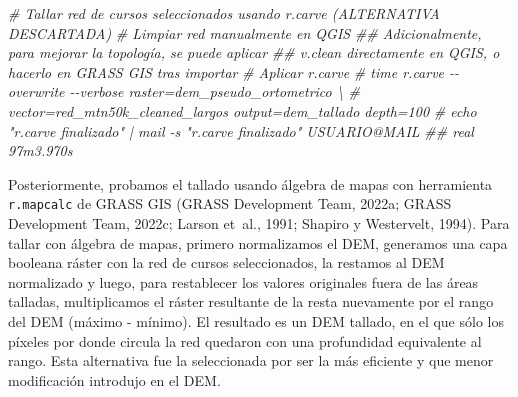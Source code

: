 \documentclass[spanish]{article}
\newenvironment{Shaded}{\begin{snugshade}}{\end{snugshade}}
\newcommand{\CommentTok}[1]{\textcolor[rgb]{0.56,0.35,0.01}{\textit{#1}}}
\begin{document}
\begin{Shaded}
\begin{Highlighting}[]
\CommentTok{\# Tallar red de cursos seleccionados usando r.carve (ALTERNATIVA DESCARTADA)}
\CommentTok{\# Limpiar red manualmente en QGIS}
\CommentTok{\#\# Adicionalmente, para mejorar la topología, se puede aplicar}
\CommentTok{\#\# v.clean directamente en QGIS, o hacerlo en GRASS GIS tras importar}
\CommentTok{\# Aplicar r.carve}
\CommentTok{\# time r.carve {-}{-}overwrite {-}{-}verbose raster=dem\_pseudo\_ortometrico \textbackslash{}}
\CommentTok{\#   vector=red\_mtn50k\_cleaned\_largos output=dem\_tallado depth=100}
\CommentTok{\# echo "r.carve finalizado" | mail {-}s "r.carve finalizado" USUARIO@MAIL}
\CommentTok{\#\# real 97m3.970s}
\end{Highlighting}
\end{Shaded}

Posteriormente, probamos el tallado usando álgebra de mapas con
herramienta \texttt{r.mapcalc} de GRASS GIS (GRASS Development Team,
2022a; GRASS Development Team, 2022c; Larson et~al., 1991; Shapiro y
Westervelt, 1994). Para tallar con álgebra de mapas, primero
normalizamos el DEM, generamos una capa booleana ráster con la red de
cursos seleccionados, la restamos al DEM normalizado y luego, para
restablecer los valores originales fuera de las áreas talladas,
multiplicamos el ráster resultante de la resta nuevamente por el rango
del DEM (máximo - mínimo). El resultado es un DEM tallado, en el que
sólo los píxeles por donde circula la red quedaron con una profundidad
equivalente al rango. Esta alternativa fue la seleccionada por ser la
más eficiente y que menor modificación introdujo en el DEM.
\end{document}
